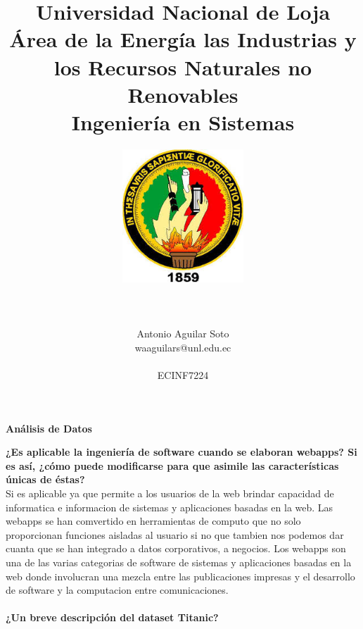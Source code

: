 \documentclass[11pt]{report}
\title{\Huge Universidad Nacional de Loja \\ 
Área de la Energía las Industrias y los Recursos Naturales no Renovables \\
Ingeniería en Sistemas \\}
\author{\includegraphics[width=5cm, height=5cm]{unl.jpg} \\\\\\\\
Antonio Aguilar Soto \\ waaguilars@unl.edu.ec \\\\
ECINF7224}\\\\
\begin{document}

\maketitle

\begin{center}\textbf{Análisis de Datos}\end{center}
\textbf{¿Es aplicable la ingeniería de software cuando se elaboran webapps? Si es así, ¿cómo puede
modificarse para que asimile las características únicas de éstas?}\\

Si es aplicable ya que permite a los usuarios de la web brindar capacidad de informatica e informacion de sistemas y aplicaciones basadas en la web. Las webapps se han comvertido en herramientas de computo que no solo proporcionan funciones aisladas al usuario si no que tambien nos podemos dar cuanta que se han integrado a datos corporativos, a negocios. Los webapps son una de las varias categorias de software de sistemas y aplicaciones basadas en la web donde involucran una mezcla entre las publicaciones impresas y el desarrollo de software y la computacion entre comunicaciones.
\\\\
\textbf{¿Un breve descripción del dataset Titanic?}
\end{document}
